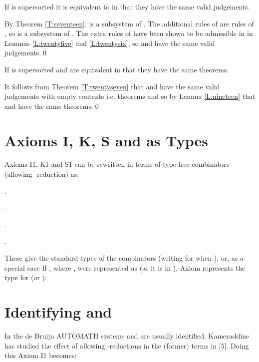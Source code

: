 \documentclass{LMCS}
\begin{document}
\begin{thm}
{\begin{thm}\label{T:twentyseven}
  If  is supersorted it is equivalent to 
  in that they have the same valid judgements.
\end{thm}

\proof By Theorem \ref{T:seventeen},  is a subsystem of
  . The additional rules of  are rules of
  , so  is a subsystem of . The
  extra rules of  have been shown to be admissible in
   in Lemmas \ref{L:twentyfive} and \ref{L:twentysix},
  so  and  have the same valid
  judgements.\qed

\begin{thm}\label{T:twentyeight}
  If  is supersorted  and  are
  equivalent in that they have the same theorems.
\end{thm}

\proof It follows from Theorem \ref{T:twentyseven} that 
  and  have the same valid judgements with empty
  contexts i.e. theorems and so by Lemma \ref{L:nineteen} that  and  have the same theorems.\qed

\section {Axioms I, K, S and \texorpdfstring{}{Pi} as Types}\label{S:IKSPi}

 \noindent Axioms I1, K1 and S1 can be rewritten in terms of type
  free combinators (allowing -reduction) as:
\medskip

.
\smallskip

.
\smallskip

.

\noindent{}.
\medskip

 \noindent These give the standard types of the combinators (writing
   for  when ):
{\small}
  or, as a special case
\small{}
  If , where , were represented as
   (as it is in ), Axiom  represents the type
  for  (or ):


\section{Identifying \texorpdfstring{}{lambda} and 
\texorpdfstring{}{Pi}}\label{S:LamPi}

  \noindent In the de Bruijn AUTOMATH systems  and  are
  usually identified.  Kameraddine has studied the effect of allowing
  -reductions in the (former)  terms in [5].  Doing this
  Axiom {I1} becomes:

}
\end{thm}
\end{document}
